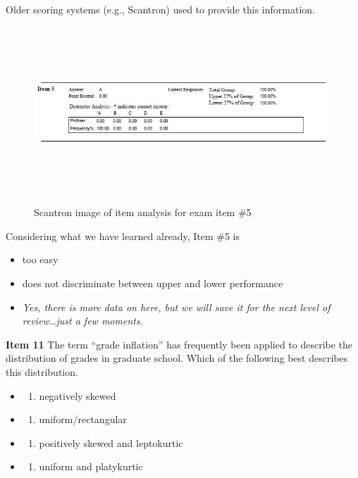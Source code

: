 \documentclass[
  english,
]{book}
\providecommand{\tightlist}{%
  \setlength{\itemsep}{0pt}\setlength{\parskip}{0pt}}
\begin{document}
Older scoring systems (e.g., Scantron) used to provide this information.

\begin{figure}
\hypertarget{id}{%
\centering
\includegraphics[width=10.41667in,height=2.60417in]{images/ItemAnalExam/Item5.jpg}
\caption{Scantron image of item analysis for exam item \#5}\label{id}
}
\end{figure}

Considering what we have learned already, Item \#5 is

\begin{itemize}
\tightlist
\item
  too easy
\item
  does not discriminate between upper and lower performance
\item
  \emph{Yes, there is more data on here, but we will save it for the next level of review\ldots just a few moments.}
\end{itemize}

\textbf{Item 11} The term ``grade inflation'' has frequently been applied to describe the distribution of grades in graduate school. Which of the following best describes this distribution.

\begin{itemize}
\item
  \begin{enumerate}
  \def\labelenumi{\alph{enumi})}
  \tightlist
  \item
    negatively skewed
  \end{enumerate}
\item
  \begin{enumerate}
  \def\labelenumi{\alph{enumi})}
  \setcounter{enumi}{1}
  \tightlist
  \item
    uniform/rectangular
  \end{enumerate}
\item
  \begin{enumerate}
  \def\labelenumi{\alph{enumi})}
  \setcounter{enumi}{2}
  \tightlist
  \item
    positively skewed and leptokurtic
  \end{enumerate}
\item
  \begin{enumerate}
  \def\labelenumi{\alph{enumi})}
  \setcounter{enumi}{3}
  \tightlist
  \item
    uniform and platykurtic
  \end{enumerate}
\end{itemize}
\end{document}
